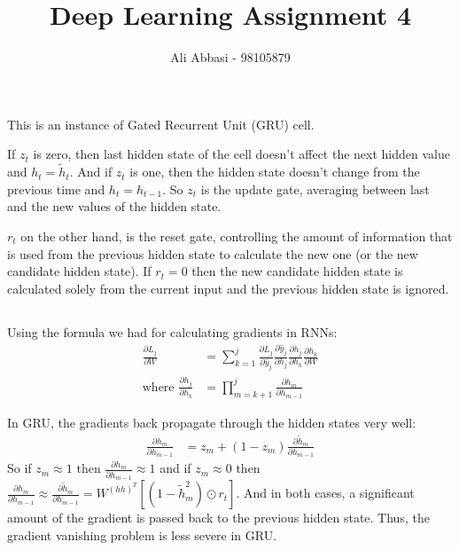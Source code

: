 \documentclass{article}
\title{Deep Learning Assignment 4}
\author{Ali Abbasi - 98105879}
\newcommand{\rond}[2][]{\frac{\partial #1}{\partial #2}}
\begin{document}
\maketitle
\section{}
\subsection{}

This is an instance of Gated Recurrent Unit (GRU) cell.

If \(z_t\) is zero, then last hidden state of the cell doesn't affect the next hidden value and \(h_t = \tilde{h}_t\).
And if \(z_t\) is one, then the hidden state doesn't change from the previous time and \(h_t = h_{t-1}\).
So \(z_t\) is the update gate, averaging between last and the new values of the hidden state.

\(r_t\) on the other hand, is the reset gate, controlling the amount of information that is used from the previous hidden state to calculate the new one (or the new candidate hidden state).
If \(r_t = 0\) then the new candidate hidden state is calculated solely from the current input and the previous hidden state is ignored.

\subsection{}
Using the formula we had for calculating gradients in RNNs:
\begin{align*}
\rond[L_j]{W} &= \sum_{k=1}^{j} \rond[L_j]{\hat{y}_j}\rond[\hat{y}_j]{h_j}\rond[h_j]{h_k}\rond[h_k]{W}\\
\text{where } \rond[h_j]{h_k} &= \prod_{m=k+1}^{j} \rond[h_m]{h_{m-1}}
\end{align*}

In GRU, the gradients back propagate through the hidden states very well:
\begin{align*}
\rond[h_m]{h_{m-1}} &= z_m + (1-z_m)\rond[\tilde{h}_m]{h_{m-1}}
\end{align*}
So if \(z_m\approx 1\) then \(\rond[h_m]{h_{m-1}} \approx 1\) and if \(z_m\approx 0\) then \(\rond[h_m]{h_{m-1}} \approx \rond[\tilde{h}_m]{h_{m-1}} = W^{(hh)^T}\left[(1 - \tilde{h}_m^2) \odot r_t\right]\).
And in both cases, a significant amount of the gradient is passed back to the previous hidden state.
Thus, the gradient vanishing problem is less severe in GRU.
\end{document}
